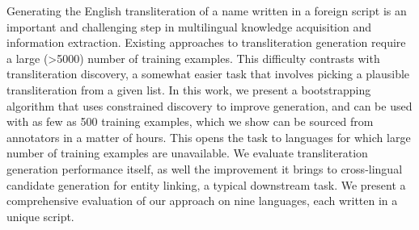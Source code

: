 Generating the English transliteration of a name written in a foreign script is an important and challenging step in multilingual knowledge acquisition and information extraction. Existing approaches to transliteration generation require a large (>5000) number of training examples. This difficulty contrasts with transliteration discovery, a somewhat easier task that involves picking a plausible transliteration from a given list. In this work, we present a bootstrapping algorithm that uses constrained discovery to improve generation, and can be used with as few as 500 training examples, which we show can be sourced from annotators in a matter of hours. This opens the task to languages for which large number of training examples are unavailable. We evaluate transliteration generation performance itself, as well the improvement it brings to cross-lingual candidate generation for entity linking, a typical downstream task. We present a comprehensive evaluation of our approach on nine languages, each written in a unique script.
